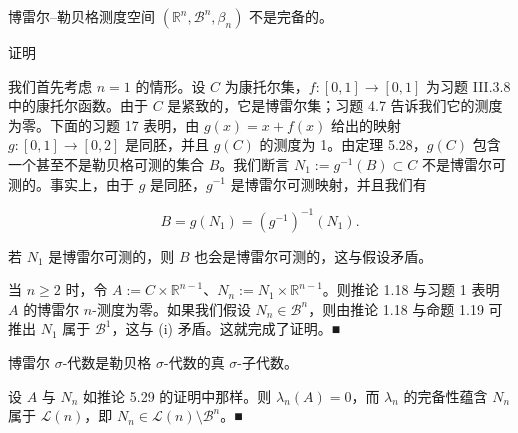 \begin{corollary}

博雷尔–勒贝格测度空间 $ (\mathbb{R}^n, \mathcal{B}^n, \beta_n) $ 不是完备的。

证明

\begin{subitems}
\item

我们首先考虑 $ n = 1 $ 的情形。设 $ C $ 为康托尔集，$ f: [0, 1] \to [0, 1] $ 为习题 III.3.8 中的康托尔函数。由于 $ C $ 是紧致的，它是博雷尔集；习题 4.7 告诉我们它的测度为零。下面的习题 17 表明，由 $ g(x) = x + f(x) $ 给出的映射 $ g: [0, 1] \to [0, 2] $ 是同胚，并且 $ g(C) $ 的测度为 1。由定理 5.28，$ g(C) $ 包含一个甚至不是勒贝格可测的集合 $ B $。我们断言 $ N_1 := g^{-1}(B) \subset C $ 不是博雷尔可测的。事实上，由于 $ g $ 是同胚，$ g^{-1} $ 是博雷尔可测映射，并且我们有

\[
B = g(N_1) = (g^{-1})^{-1}(N_1) .
\]

若 $ N_1 $ 是博雷尔可测的，则 $ B $ 也会是博雷尔可测的，这与假设矛盾。

\item

当 $ n \ge 2 $ 时，令 $ A := C \times \mathbb{R}^{n-1} $、$ N_n := N_1 \times \mathbb{R}^{n-1} $。则推论 1.18 与习题 1 表明 $ A $ 的博雷尔 $ n $-测度为零。如果我们假设 $ N_n \in \mathcal{B}^n $，则由推论 1.18 与命题 1.19 可推出 $ N_1 $ 属于 $ \mathcal{B}^1 $，这与 (i) 矛盾。这就完成了证明。\nobreak\hspace{0.35em}■

\end{subitems}

\end{corollary}

\begin{corollary}

博雷尔 $ \sigma $-代数是勒贝格 $ \sigma $-代数的真 $ \sigma $-子代数。

\proofhead
设 $ A $ 与 $ N_n $ 如推论 5.29 的证明中那样。则 $ \lambda_n(A) = 0 $，而 $ \lambda_n $ 的完备性蕴含 $ N_n $ 属于 $ \mathcal{L}(n) $，即 $ N_n \in \mathcal{L}(n) \setminus \mathcal{B}^n $。\nobreak\hspace{0.35em}■
\end{corollary}

